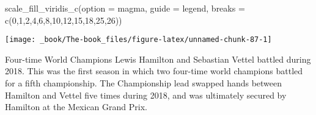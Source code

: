 \documentclass[
]{book}
\newenvironment{Shaded}{\begin{snugshade}}{\end{snugshade}}
\newcommand{\AttributeTok}[1]{\textcolor[rgb]{0.77,0.63,0.00}{#1}}
\newcommand{\DecValTok}[1]{\textcolor[rgb]{0.00,0.00,0.81}{#1}}
\newcommand{\FunctionTok}[1]{\textcolor[rgb]{0.00,0.00,0.00}{#1}}
\newcommand{\NormalTok}[1]{#1}
\newcommand{\StringTok}[1]{\textcolor[rgb]{0.31,0.60,0.02}{#1}}
\begin{document}
\begin{Shaded}
\begin{Highlighting}[]
  \FunctionTok{scale\_fill\_viridis\_c}\NormalTok{(}\AttributeTok{option =} \StringTok{\textquotesingle{}magma\textquotesingle{}}\NormalTok{,}
                       \AttributeTok{guide =} \StringTok{\textquotesingle{}legend\textquotesingle{}}\NormalTok{,}
                       \AttributeTok{breaks =} \FunctionTok{c}\NormalTok{(}\DecValTok{0}\NormalTok{,}\DecValTok{1}\NormalTok{,}\DecValTok{2}\NormalTok{,}\DecValTok{4}\NormalTok{,}\DecValTok{6}\NormalTok{,}\DecValTok{8}\NormalTok{,}\DecValTok{10}\NormalTok{,}\DecValTok{12}\NormalTok{,}\DecValTok{15}\NormalTok{,}\DecValTok{18}\NormalTok{,}\DecValTok{25}\NormalTok{,}\DecValTok{26}\NormalTok{))}
\end{Highlighting}
\end{Shaded}

\begin{center}\texttt{[image: \_book/The-book\_files/figure-latex/unnamed-chunk-87-1]} \end{center}

Four-time World Champions Lewis Hamilton and Sebastian Vettel battled during 2018. This was the first season in which two four-time world champions battled for a fifth championship. The Championship lead swapped hands between Hamilton and Vettel five times during 2018, and was ultimately secured by Hamilton at the Mexican Grand Prix.
\end{document}
